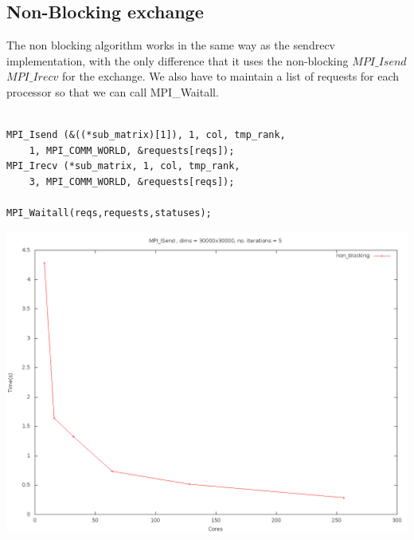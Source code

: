 \documentclass[11pt]{article}
\begin{document}
\subsection{Non-Blocking exchange}
The non blocking algorithm works in the same way as the sendrecv implementation, with the only difference that it uses the non-blocking $MPI\_Isend$
$MPI\_Irecv$ for the exchange. We also have to maintain a list of requests for each processor so that we can call MPI\_Waitall.
\begin{lstlisting}[label=some-code, caption=Non-blocking MPI left call + MPI\_Waitall]
      
MPI_Isend (&((*sub_matrix)[1]), 1, col, tmp_rank, 
    1, MPI_COMM_WORLD, &requests[reqs]);
MPI_Irecv (*sub_matrix, 1, col, tmp_rank, 
    3, MPI_COMM_WORLD, &requests[reqs]);

MPI_Waitall(reqs,requests,statuses);

\end{lstlisting}
\includegraphics[width=\textwidth]{nbcxt.png}
\end{document}
